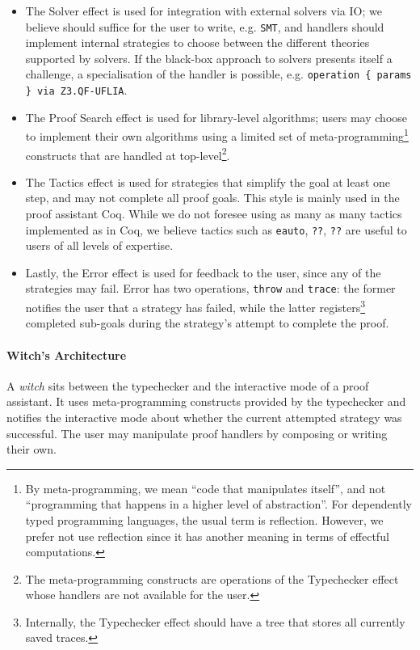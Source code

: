 \documentclass[sigconfl]{acmart}
\begin{document}
\begin{itemize}
  \item The Solver effect is used for integration with external solvers via IO;
    we believe should suffice for the user to write, e.g. \texttt{SMT}, and handlers should
    implement internal strategies to choose between the different theories
    supported by solvers. If the black-box approach to solvers presents itself a
    challenge, a specialisation of the handler is possible, e.g.
    \texttt{operation \{ params \} via Z3.QF-UFLIA}.
  \item The Proof Search effect is used for library-level algorithms; users may
    choose to implement their own algorithms using a limited set of
    meta-programming\footnote{By meta-programming, we mean ``code that manipulates
    itself'', and not ``programming that happens in a higher level of abstraction''.
    For dependently typed programming languages, the usual term is reflection.
    However, we prefer not use reflection since it has another meaning in
    terms of effectful computations.} constructs that are handled at top-level\footnote{The
      meta-programming constructs are operations of the Typechecker effect
      whose handlers are not available for the user.}.
  \item The Tactics effect is used for strategies that simplify the goal at
    least one step, and may not complete all proof goals. This style is mainly
    used in the proof assistant Coq. While we do not foresee using as many as many
    tactics implemented as in Coq, we believe tactics such as
    \texttt{eauto}, \texttt{??}, \texttt{??} are useful to users of
    all levels of expertise.
    \item Lastly, the Error effect is used for feedback to the user,
    since any of the strategies may fail. Error has two operations,
    \texttt{throw} and \texttt{trace}: the former notifies the user that a strategy
    has failed, while the latter registers\footnote{Internally, the
      Typechecker effect should have a tree that stores all currently
      saved traces.} completed sub-goals during the
    strategy's attempt to complete the proof.
\end{itemize}

\paragraph{Witch's Architecture}
A \textit{witch} sits between the typechecker and the interactive mode of a
proof assistant. It uses meta-programming constructs provided by the typechecker and notifies
the interactive mode about whether the current attempted strategy was successful.
The user may manipulate proof handlers by composing or writing their own.
\end{document}
